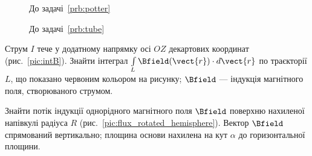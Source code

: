 \begin{figure}[h!]\centering
\begin{minipage}[t]{0.45\linewidth}\centering
{}
\caption{До задачі~\ref{prb:potter}}
\label{pic:potter}
\end{minipage}
\begin{minipage}[t]{0.45\linewidth}\centering
\caption{До задачі~\ref{prb:tube}}
\label{pic:tube}
\end{minipage}
\end{figure}




\begin{problem}\label{prb:intLB}
Струм $I$  тече у додатному напрямку осі $OZ$ декартових координат (рис.~\ref{pic:intB}).
Знайти інтеграл $\int\limits_L \Bfield(\vect{r})\cdot d\vect{r}$ по траєкторії $L$, що показано червоним кольором на рисунку;  $\Bfield$ ---
індукція
магнітного поля, створюваного струмом.
\end{problem}


\begin{problem}\label{prb:flux_rotated_hemisphere}
Знайти потік індукції однорідного магнітного поля $\Bfield$ поверхню нахиленої напівкулі радіуса $R$ (рис.~\ref{pic:flux_rotated_hemisphere}). Вектор
$\Bfield$
спрямований  вертикально; площина основи нахилена на кут $\alpha$ до горизонтальної площини.
\end{problem}



